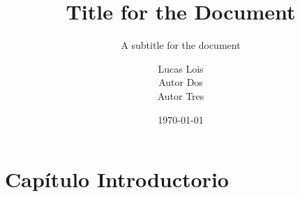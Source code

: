 \documentclass[12pt]{report}
\title{Title for the Document}
\subtitle{A subtitle for the document}
\author{
	Lucas Lois\\
	Autor Dos\\
	Autor Tres
}
\institute{Universidad Católica del Uruguay}
\date{\today}
\begin{document}

\tableofcontents
\chapter{Capítulo Introductorio}

\blindtext \parencite{coulouris}

\pagebreak
\printbibliography{}
\end{document}
